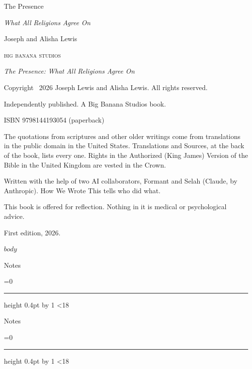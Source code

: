 \documentclass[11pt,twoside,openright]{book}
\newcommand{\notespage}{\thispagestyle{empty}\vspace*{0.35in}
  \begin{center}{\Large Notes\par}\end{center}\vspace{0.3in}
  {\color{black!28}\count255=0
   \loop\hrule height 0.4pt\vskip 0.3in
   \advance\count255 by 1 \ifnum\count255<18 \repeat}\clearpage}
\begin{document}
\frontmatter
\pagestyle{empty}

\vspace*{1.5in}
\begin{center}
{\Huge The Presence\par}
\vspace{14pt}
{\Large\itshape What All Religions Agree On\par}
\vfill
{\large Joseph and Alisha Lewis\par}
\vspace{0.7in}
{\small\scshape big banana studios\par}
\end{center}
\clearpage

\vspace*{\fill}
{\small\setlength{\parindent}{0pt}\setlength{\parskip}{6pt}
\emph{The Presence: What All Religions Agree On}

Copyright \textcopyright\ 2026 Joseph Lewis and Alisha Lewis. All rights reserved.

Independently published. A Big Banana Studios book.

ISBN 9798144193054 (paperback)

The quotations from scriptures and other older writings come from translations in the public domain in the United States. Translations and Sources, at the back of the book, lists every one. Rights in the Authorized (King James) Version of the Bible in the United Kingdom are vested in the Crown.

Written with the help of two AI collaborators, Formant and Selah (Claude, by Anthropic). How We Wrote This tells who did what.

This book is offered for reflection. Nothing in it is medical or psychological advice.

First edition, 2026.\par}
\clearpage

\pagestyle{fancy}
\tableofcontents

$body$

\clearpage
\notespage
\ifodd\value{page}\else\notespage\fi
\end{document}

